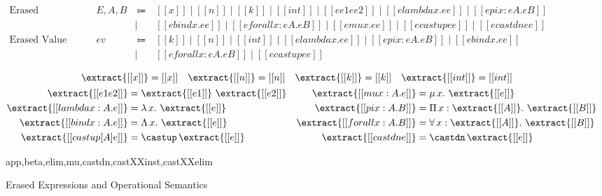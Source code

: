 \begin{figure}
  \centering
  \begin{equation*}
  \begin{array}{llcl}
      \text{Erased Expressions} & E, A, B & ~ \Coloneqq ~ & [[x]] \mid [[n]] \mid [[k]] \mid [[int]] \mid [[ee1 ee2]] \mid [[elambda x. ee]] \mid [[epi x : eA. eB]] \\
      & & \mid & [[ebind x. ee]] \mid [[eforall x : eA. eB]] \mid [[emu x. ee]] \mid [[ecastup ee]] \mid [[ecastdn ee]] \\
      \text{Erased Value} & ev & ~ \Coloneqq ~ & [[k]] \mid [[n]] \mid [[int]] \mid [[elambda x. ee]] \mid [[epi x : eA. eB]] \mid [[ebind x. ee]] \\
      & & \mid & [[eforall x : eA. eB]] \mid [[ecastup ee]]
  \end{array}
  \end{equation*}

  \begin{gather*}
    \begin{align*}
    \extract{[[x]]} &= [[x]] &
    \extract{[[n]]} &= [[n]] &
    \extract{[[k]]} &= [[k]] &
    \extract{[[int]]} &= [[int]]
    \end{align*} \\
    \begin{align*}
     \extract{[[e1 e2]]} &= \extract{[[e1]]} ~ \extract{[[e2]]} & %
      \extract{[[mu x : A. e]]} &= \mu \, x. ~ \extract{[[e]]} \\
     \extract{[[lambda x : A. e]]} &= \lambda \, x. ~ \extract{[[e]]} & %
      \extract{[[pi x : A. B]]} &= \Pi \, x : \extract{[[A]]}. ~ \extract{[[B]]} \\
     \extract{[[bind x : A. e]]} &= \Lambda \, x. ~ \extract{[[e]]} & %
      \extract{[[forall x : A. B]]} &= \forall \, x : \extract{[[A]]}. ~ \extract{[[B]]} \\
     \extract{[[castup [A] e]]} &= \castup \, \extract{[[e]]} & %
      \extract{[[castdn e]]} &= \castdn \, \extract{[[e]]}
    \end{align*}
  \end{gather*}

    {app,beta,elim,mu,castdn,castXXinst,castXXelim}
  \caption{Erased Expressions and Operational Semantics}
  \label{fig:extraction}
\end{figure}

